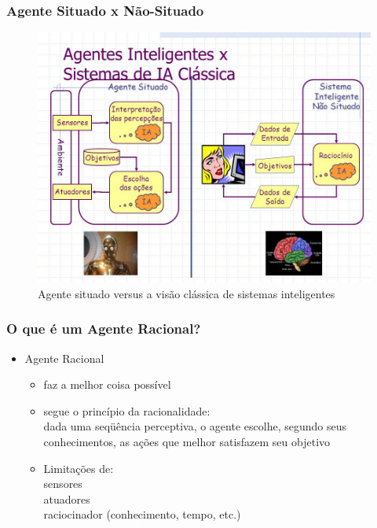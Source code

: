 \begin{frame} %

    \frametitle{Agente Situado x Não-Situado}

    
\begin{figure}[!ht]
\centering
\includegraphics[height =.65\textheight,width=.8\textwidth]{figuras/agente_situado.jpg}
\caption{Agente situado versus a visão clássica de sistemas inteligentes}
\end{figure}

\end{frame}


\begin{frame} %

    \frametitle{O que é um Agente Racional?}

\begin{block}{}
  
 \begin{itemize}
      \item Agente Racional 
 \begin{itemize}
        \item faz a melhor coisa possível
        \item segue o princípio da racionalidade:\\ 
dada uma seqüência perceptiva, 
o agente escolhe, segundo seus conhecimentos, 
as ações que melhor satisfazem seu objetivo
      \end{itemize}

\begin{itemize}
  \item Limitações de:\\
  sensores\\
  atuadores\\
  raciocinador (conhecimento, tempo, etc.)
\end{itemize}

    \end{itemize}
  
\end{block}

\end{frame}



